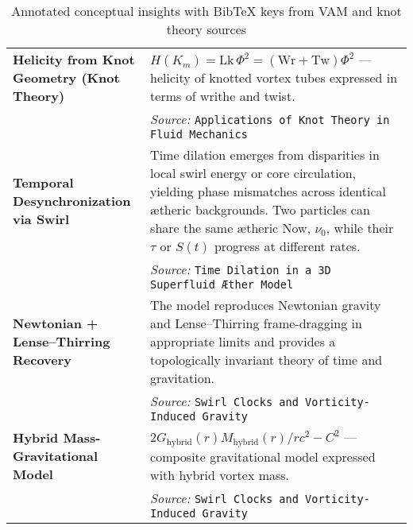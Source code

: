 \documentclass[11pt]{article}
\begin{document}
\begin{table}[H]
\begin{tabular}{|p{4.3cm}|p{9.5cm}|}
\textbf{Helicity from Knot Geometry (Knot Theory)} &
$H(K_m) = \text{Lk} \, \Phi^2 = (\text{Wr} + \text{Tw}) \Phi^2$ — helicity of knotted vortex tubes expressed in terms of writhe and twist.\\
& \textit{Source:}  \texttt{Applications of Knot Theory in Fluid Mechanics} \\
\hline

\textbf{Temporal Desynchronization via Swirl} &
Time dilation emerges from disparities in local swirl energy or core circulation, yielding phase mismatches across identical ætheric backgrounds. Two particles can share the same ætheric Now, $\nu_0$, while their $\tau$ or $S(t)$ progress at different rates.\\
& \textit{Source:}  \texttt{Time Dilation in a 3D Superfluid Æther Model}\\
\hline

\textbf{Newtonian + Lense–Thirring Recovery} &
The model reproduces Newtonian gravity and Lense–Thirring frame-dragging in appropriate limits and provides a topologically invariant theory of time and gravitation.\\
& \textit{Source:} \texttt{Swirl Clocks and Vorticity-Induced Gravity}\\
\hline

\textbf{Hybrid Mass-Gravitational Model} &
$2G_\text{hybrid}(r) M_\text{hybrid}(r)/r c^2 - C^2$ — composite gravitational model expressed with hybrid vortex mass.\\
& \textit{Source:} \texttt{Swirl Clocks and Vorticity-Induced Gravity}\\
\hline
\end{tabular}
\caption{Annotated conceptual insights with BibTeX keys from VAM and knot theory sources}
\label{tab:annotated_refs}
\end{table}



  \ifdefined\standalonechapter\else
  
  
\end{document}
